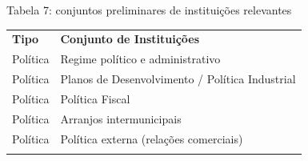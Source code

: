 Tabela 7: conjuntos preliminares de instituições relevantes

\begin{longtable}[]{@{}
  >{\raggedright\arraybackslash}p{}
  >{\raggedright\arraybackslash}p{}@{}}
\toprule\noalign{}
\begin{minipage}[b]{\linewidth}\raggedright
\textbf{Tipo}
\end{minipage} & \begin{minipage}[b]{\linewidth}\raggedright
\textbf{Conjunto de Instituições}
\end{minipage} \\
\begin{minipage}[b]{\linewidth}\raggedright
Política
\end{minipage} & \begin{minipage}[b]{\linewidth}\raggedright
Regime político e administrativo
\end{minipage} \\
\begin{minipage}[b]{\linewidth}\raggedright
Política
\end{minipage} & \begin{minipage}[b]{\linewidth}\raggedright
Planos de Desenvolvimento / Política Industrial
\end{minipage} \\
\begin{minipage}[b]{\linewidth}\raggedright
Política
\end{minipage} & \begin{minipage}[b]{\linewidth}\raggedright
Política Fiscal
\end{minipage} \\
\begin{minipage}[b]{\linewidth}\raggedright
Política
\end{minipage} & \begin{minipage}[b]{\linewidth}\raggedright
Arranjos intermunicipais
\end{minipage} \\
\begin{minipage}[b]{\linewidth}\raggedright
Política
\end{minipage} & \begin{minipage}[b]{\linewidth}\raggedright
Política externa (relações comerciais)
\end{minipage} \\
\begin{minipage}[b]{\linewidth}\raggedright

\end{minipage}
\end{longtable}
